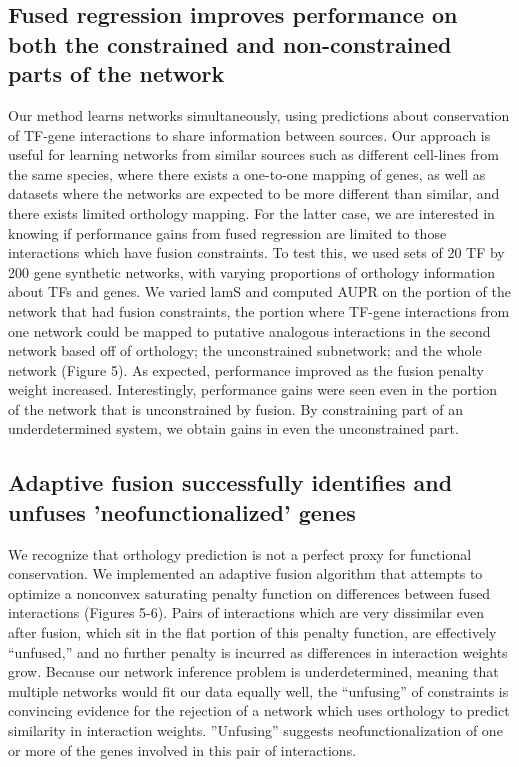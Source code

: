 \documentclass[11pt]{article}
\begin{document}
\subsection{Fused regression improves performance on both the constrained and non-constrained parts of the network}
Our method learns networks simultaneously, using predictions about conservation of TF-gene interactions to share information between sources. Our approach is useful for learning networks from similar sources such as different cell-lines from the same species, where there exists a one-to-one mapping of genes, as well as datasets where the networks are expected to be more different than similar, and there exists limited orthology mapping. For the latter case, we are interested in knowing if performance gains from fused regression are limited to those interactions which have fusion constraints. To test this, we used sets of 20 TF by 200 gene synthetic networks, with varying proportions of orthology information about TFs and genes. We varied lamS and computed AUPR on the portion of the network that had fusion constraints, the portion where TF-gene interactions from one network could be mapped to putative analogous interactions in the second network based off of orthology; the unconstrained subnetwork; and the whole network (Figure 5). As expected, performance improved as the fusion penalty weight increased. Interestingly, performance gains were seen even in the portion of the network that is unconstrained by fusion. By constraining part of an underdetermined system, we obtain gains in even the unconstrained part. 

\subsection{Adaptive fusion successfully identifies and unfuses 'neofunctionalized' genes}
We recognize that orthology prediction is not a perfect proxy for functional conservation. We implemented an adaptive fusion algorithm that attempts to optimize a nonconvex saturating penalty function on differences between fused interactions (Figures 5-6). Pairs of interactions which are very dissimilar even after fusion, which sit in the flat portion of this penalty function, are effectively ``unfused,'' and no further penalty is incurred as differences in interaction weights grow. Because our network inference problem is underdetermined, meaning that multiple networks would fit our data equally well, the ``unfusing'' of constraints is convincing evidence for the rejection of a network which uses orthology to predict similarity in interaction weights. ''Unfusing'' suggests neofunctionalization of one or more of the genes involved in this pair of interactions.
\end{document}
